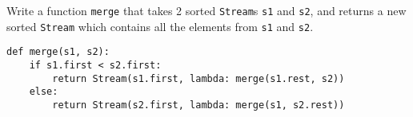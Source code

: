 \question Write a function \lstinline$merge$ that takes 2 sorted
\lstinline$Stream$s \lstinline$s1$ and \lstinline$s2$, and returns a new
sorted \lstinline$Stream$ which contains all the elements from \lstinline$s1$
and \lstinline$s2$.

\begin{solution}[2cm]
\begin{lstlisting}
def merge(s1, s2):
    if s1.first < s2.first:
        return Stream(s1.first, lambda: merge(s1.rest, s2))
    else:
        return Stream(s2.first, lambda: merge(s1, s2.rest))
\end{lstlisting}
\end{solution}

